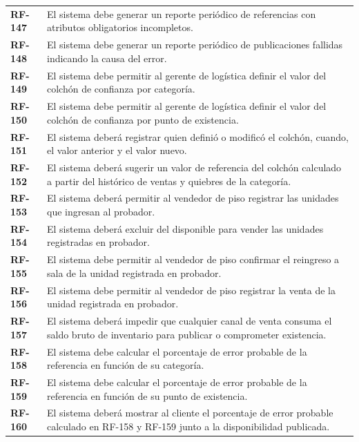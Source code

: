 \documentclass[11pt]{article}
\begin{document}
\begin{longtable}[]{@{}
  >{\raggedright\arraybackslash}p{}
  >{\raggedright\arraybackslash}p{}@{}}
\addlinespace[2pt]
\textbf{RF-147} & El sistema debe generar un reporte periódico de referencias con atributos obligatorios incompletos. \\
\addlinespace[2pt]
\textbf{RF-148} & El sistema debe generar un reporte periódico de publicaciones fallidas indicando la causa del error. \\
\addlinespace[2pt]
\textbf{RF-149} & El sistema debe permitir al gerente de logística definir el valor del colchón de confianza por categoría. \\
\addlinespace[2pt]
\textbf{RF-150} & El sistema debe permitir al gerente de logística definir el valor del colchón de confianza por punto de existencia. \\
\addlinespace[2pt]
\textbf{RF-151} & El sistema deberá registrar quien definió o modificó el colchón, cuando, el valor anterior y el valor nuevo. \\
\addlinespace[2pt]
\textbf{RF-152} & El sistema deberá sugerir un valor de referencia del colchón calculado a partir del histórico de ventas y quiebres de la categoría. \\
\addlinespace[2pt]
\textbf{RF-153} & El sistema deberá permitir al vendedor de piso registrar las unidades que ingresan al probador. \\
\addlinespace[2pt]
\textbf{RF-154} & El sistema deberá excluir del disponible para vender las unidades registradas en probador. \\
\addlinespace[2pt]
\textbf{RF-155} & El sistema debe permitir al vendedor de piso confirmar el reingreso a sala de la unidad registrada en probador. \\
\addlinespace[2pt]
\textbf{RF-156} & El sistema debe permitir al vendedor de piso registrar la venta de la unidad registrada en probador. \\
\addlinespace[2pt]
\textbf{RF-157} & El sistema deberá impedir que cualquier canal de venta consuma el saldo bruto de inventario para publicar o comprometer existencia. \\
\addlinespace[2pt]
\textbf{RF-158} & El sistema debe calcular el porcentaje de error probable de la referencia en función de su categoría. \\
\addlinespace[2pt]
\textbf{RF-159} & El sistema debe calcular el porcentaje de error probable de la referencia en función de su punto de existencia. \\
\addlinespace[2pt]
\textbf{RF-160} & El sistema deberá mostrar al cliente el porcentaje de error probable calculado en RF-158 y RF-159 junto a la disponibilidad publicada. \\

\end{longtable}
\end{document}
